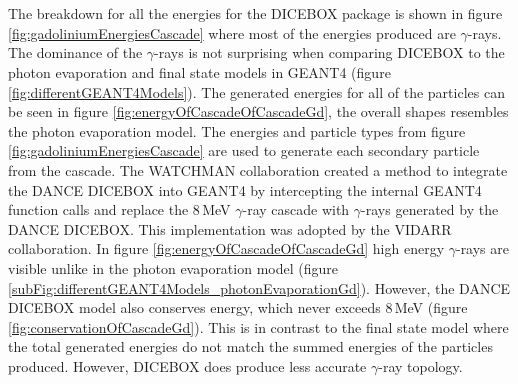 \\\\The breakdown for all the energies for the DICEBOX package is shown in figure \ref{fig:gadoliniumEnergiesCascade} where most of the energies produced are $\gamma$-rays. The dominance of the $\gamma$-rays is not surprising when comparing DICEBOX to the photon evaporation and final state models in GEANT4 (figure \ref{fig:differentGEANT4Models}). The generated energies for all of the particles can be seen in figure \ref{fig:energyOfCascadeOfCascadeGd}, the overall shapes resembles the photon evaporation model. The energies and particle types from figure \ref{fig:gadoliniumEnergiesCascade} are used to generate each secondary particle from the cascade. The WATCHMAN collaboration created a method to integrate the DANCE DICEBOX into GEANT4 by intercepting the internal GEANT4 function calls and replace the 8\,MeV $\gamma$-ray cascade with $\gamma$-rays generated by the DANCE DICEBOX. This implementation was adopted by the VIDARR collaboration. In figure \ref{fig:energyOfCascadeOfCascadeGd} high energy $\gamma$-rays are visible unlike in the photon evaporation model (figure \ref{subFig:differentGEANT4Models_photonEvaporationGd}). However, the DANCE DICEBOX model also conserves energy, which never exceeds 8\,MeV (figure \ref{fig:conservationOfCascadeGd}). This is in contrast to the final state model where the total generated energies do not match the summed energies of the particles produced. However, DICEBOX does produce less accurate $\gamma$-ray topology.

